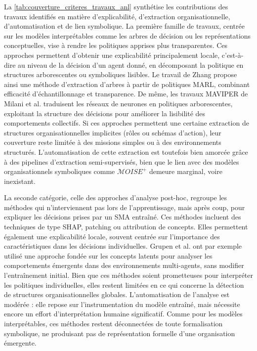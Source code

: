 La \autoref{tab:couverture_criteres_travaux_anl} synthétise les contributions des travaux identifiés en matière d'explicabilité, d'extraction organisationnelle, d'automatisation et de lien symbolique. La première famille de travaux, centrée sur les modèles interprétables comme les arbres de décision ou les représentations conceptuelles, vise à rendre les politiques apprises plus transparentes. Ces approches permettent d’obtenir une explicabilité principalement locale, c’est-à-dire au niveau de la décision d’un agent donné, en décomposant la politique en structures arborescentes ou symboliques lisibles. Le travail de Zhang \cite{zhang2024advancing} propose ainsi une méthode d'extraction d’arbres à partir de politiques MARL, combinant efficacité d’échantillonnage et transparence. De même, les travaux MAVIPER de Milani et al. \cite{milani2022maviper,milani2024interpretable} traduisent les réseaux de neurones en politiques arborescentes, exploitant la structure des décisions pour améliorer la lisibilité des comportements collectifs. Si ces approches permettent une certaine extraction de structures organisationnelles implicites (rôles ou schémas d’action), leur couverture reste limitée à des missions simples ou à des environnements structurés. L’automatisation de cette extraction est toutefois bien amorcée grâce à des pipelines d’extraction semi-supervisés, bien que le lien avec des modèles organisationnels symboliques comme $\mathcal{M}OISE^+$ demeure marginal, voire inexistant.

La seconde catégorie, celle des approches d’analyse post-hoc, regroupe les méthodes qui n'interviennent pas lors de l'apprentissage, mais après coup, pour expliquer les décisions prises par un SMA entraîné. Ces méthodes incluent des techniques de type SHAP, patching ou attribution de concepts. Elles permettent également une explicabilité locale, souvent centrée sur l'importance des caractéristiques dans les décisions individuelles. Grupen et al. \cite{grupen2022concept} ont par exemple utilisé une approche fondée sur les concepts latents pour analyser les comportements émergents dans des environnements multi-agents, sans modifier l'entraînement initial. Bien que ces méthodes soient prometteuses pour interpréter les politiques individuelles, elles restent limitées en ce qui concerne la détection de structures organisationnelles globales. L’automatisation de l’analyse est modérée : elle repose sur l’instrumentation du modèle entraîné, mais nécessite encore un effort d’interprétation humaine significatif. Comme pour les modèles interprétables, ces méthodes restent déconnectées de toute formalisation symbolique, ne produisant pas de représentation formelle d’une organisation émergente.

